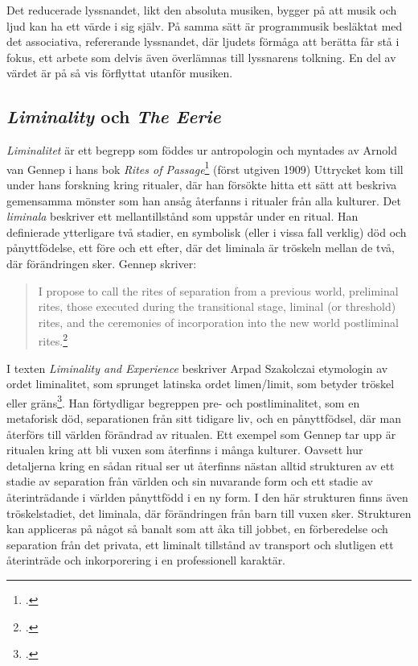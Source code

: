 \documentclass{article}
\begin{document}
Det reducerade lyssnandet, likt den absoluta musiken, bygger på att musik och ljud kan ha ett värde i sig
själv. På samma sätt är programmusik besläktat med det associativa, refererande lyssnandet, där ljudets
förmåga att berätta får stå i fokus, ett arbete som delvis även överlämnas till lyssnarens tolkning. En del av
värdet är på så vis förflyttat utanför musiken.

\subsection{\emph{Liminality} och \emph{The Eerie}}
\emph{Liminalitet} är ett begrepp som föddes ur antropologin och myntades av Arnold van Gennep i hans bok \emph{Rites
of Passage}\footcite{Gennep} (först utgiven 1909) Uttrycket kom till under hans forskning kring ritualer, där
han försökte hitta ett sätt att beskriva gemensamma mönster som han ansåg återfanns i ritualer från alla
kulturer. Det \emph{liminala} beskriver ett mellantillstånd som uppstår under en ritual. Han definierade
ytterligare två stadier, en symbolisk (eller i vissa fall verklig) död och pånyttfödelse, ett före och ett
efter, där det liminala är tröskeln mellan de två, där förändringen sker. Gennep skriver:

\begin{quote}
I propose to call the rites of separation from a previous world, preliminal rites, those executed during the
transitional stage, liminal (or threshold) rites, and the ceremonies of incorporation into the new world
postliminal rites.\footcite[21]{Gennep}
\end{quote}

I texten \emph{Liminality and Experience} beskriver Arpad Szakolczai etymologin av ordet liminalitet, som
sprunget latinska ordet limen/limit, som betyder tröskel eller gräns\footcite[147-148]{Arpad}. Han förtydligar
begreppen pre- och postliminalitet, som en metaforisk död, separationen från sitt tidigare liv, och en
pånyttfödsel, där man återförs till världen förändrad av ritualen. Ett exempel som Gennep tar upp är ritualen
kring att bli vuxen som återfinns i många kulturer. Oavsett hur detaljerna kring en sådan ritual ser ut
återfinns nästan alltid strukturen av ett stadie av separation från världen och sin nuvarande form och ett
stadie av återinträdande i världen pånyttfödd i en ny form. I den här strukturen finns även tröskelstadiet,
det liminala, där förändringen från barn till vuxen sker. Strukturen kan appliceras på något så banalt som att
åka till jobbet, en förberedelse och separation från det privata, ett liminalt tillstånd av transport och
slutligen ett återinträde och inkorporering i en professionell karaktär.
\end{document}
